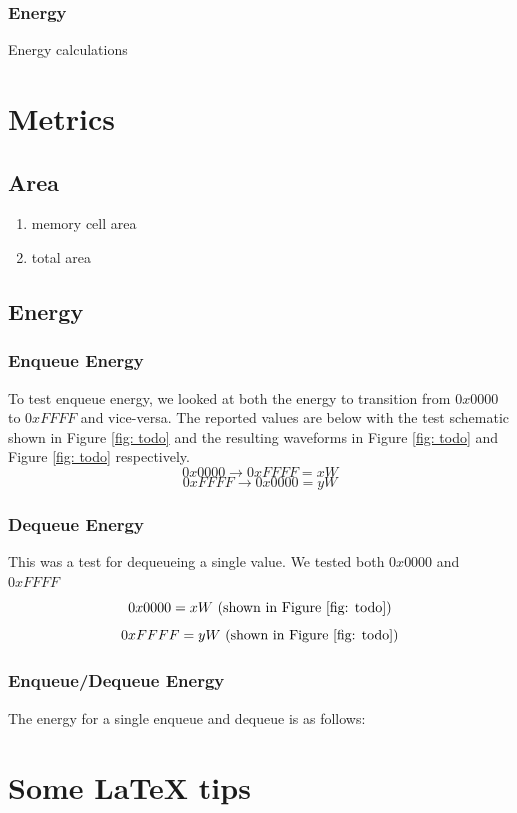 \documentclass[a4paper]{article}
\begin{document}
\subsubsection{Energy}
Energy calculations



\section{Metrics}
\label{sec:mtrics}

\subsection{Area}
\begin{enumerate}
\item memory cell area
\item total area
\end{enumerate}

\subsection{Energy}
\subsubsection{Enqueue Energy}
To test enqueue energy, we looked at both the energy to transition from $0x0000$ to $0xFFFF$ and vice-versa. The reported values are below with the test schematic shown in Figure \ref{fig: todo} and the resulting waveforms in Figure \ref{fig: todo} and Figure \ref{fig: todo} respectively.
$$0x0000 \rightarrow 0xFFFF = xW$$
$$0xFFFF \rightarrow 0x0000 = yW$$
\subsubsection{Dequeue Energy}
This was a test for dequeueing a single value. We tested both $0x0000$ and $0xFFFF$
$$0x0000 = xW\textnormal{ (shown in Figure \ref{fig: todo})}$$
$$0xFFFF = yW\textnormal{ (shown in Figure \ref{fig: todo})}$$

\subsubsection{Enqueue/Dequeue Energy}
The energy for a single enqueue and dequeue is as follows:

\newpage
\section{Some LaTeX tips}
\label{sec:latex}
\end{document}
